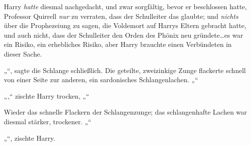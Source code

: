Harry \emph{hatte} diesmal nachgedacht, und zwar sorgfältig, bevor er beschlossen hatte, Professor Quirrell \emph{nur} zu verraten, dass der Schulleiter das glaubte; und \emph{nichts} über die Prophezeiung zu sagen, die Voldemort auf Harrys Eltern gebracht hatte, und auch nicht, dass der Schulleiter den Orden des Phönix neu gründete…es war ein Risiko, ein erhebliches Risiko, aber Harry brauchte einen Verbündeten in dieser Sache.

„“, sagte die Schlange schließlich. Die geteilte, zweizinkige Zunge flackerte schnell von einer Seite zur anderen, ein sardonisches Schlangenlachen. „“

„,“ zischte Harry trocken, „“

Wieder das schnelle Flackern der Schlangenzunge; das schlangenhafte Lachen war diesmal stärker, trockener. „“

„“, zischte Harry.

